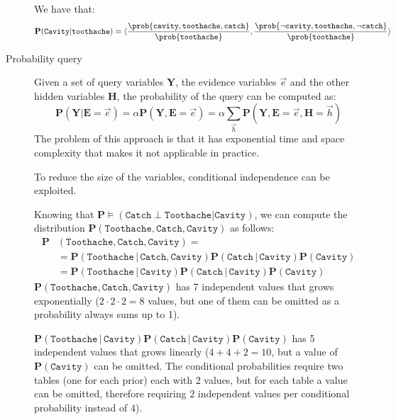 \begin{description}
\begin{example}
            We have that:
            \[
                \textbf{P}(\texttt{Cavity} \vert \texttt{toothache}) = 
                    \langle 
                        \frac{\prob{\texttt{cavity}, \texttt{toothache}, \texttt{catch}}}{\prob{\texttt{toothache}}},
                        \frac{\prob{\lnot\texttt{cavity}, \texttt{toothache}, \lnot\texttt{catch}}}{\prob{\texttt{toothache}}}
                    \rangle  
            \]
        \end{example}

    \item[Probability query] 
        Given a set of query variables $\bm{Y}$, the evidence variables $\vec{e}$ and the other hidden variables $\bm{H}$,
        the probability of the query can be computed as:
        \[ 
            \textbf{P}(\bm{Y} \vert \bm{E}=\vec{e}) = \alpha \textbf{P}(\bm{Y}, \bm{E}=\vec{e})
                = \alpha \sum_{\vec{h}} \textbf{P}(\bm{Y}, \bm{E}=\vec{e}, \bm{H}=\vec{h})
        \]
        The problem of this approach is that it has exponential time and space complexity
        that makes it not applicable in practice.

        To reduce the size of the variables, conditional independence can be exploited.
        \begin{example}
            Knowing that $\textbf{P} \models (\texttt{Catch} \perp \texttt{Toothache} \vert \texttt{Cavity})$,
            we can compute the distribution $\textbf{P}(\texttt{Toothache}, \texttt{Catch}, \texttt{Cavity})$ as follows:
            \[
                \begin{split}
                    \textbf{P}&(\texttt{Toothache}, \texttt{Catch}, \texttt{Cavity}) = \\
                        &= \textbf{P}(\texttt{Toothache} \,\vert\, \texttt{Catch}, \texttt{Cavity})
                            \textbf{P}(\texttt{Catch} \,\vert\, \texttt{Cavity}) \textbf{P}(\texttt{Cavity}) \\
                        &= \textbf{P}(\texttt{Toothache} \,\vert\, \texttt{Cavity})
                            \textbf{P}(\texttt{Catch} \,\vert\, \texttt{Cavity}) \textbf{P}(\texttt{Cavity})
                \end{split}
            \]
            $\textbf{P}(\texttt{Toothache}, \texttt{Catch}, \texttt{Cavity})$ has 7 independent values that grows exponentially
            ($2 \cdot 2 \cdot 2 = 8$ values, but one of them can be omitted as a probability always sums up to 1).

            $\textbf{P}(\texttt{Toothache} \,\vert\, \texttt{Cavity}) \textbf{P}(\texttt{Catch} \,\vert\, \texttt{Cavity}) \textbf{P}(\texttt{Cavity})$
            has 5 independent values that grows linearly ($4 + 4 + 2 = 10$, but a value of $\textbf{P}(\texttt{Cavity})$ can be omitted.
            The conditional probabilities require two tables (one for each prior) each with 2 values, 
            but for each table a value can be omitted, therefore requiring $2$ independent values per conditional probability instead of $4$).
        \end{example}
\end{description}




